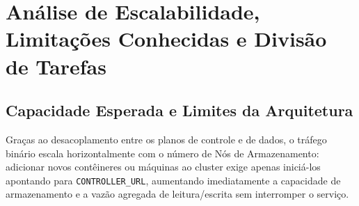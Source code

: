 \documentclass[10pt,a4paper]{article}
\begin{document}
\section{Análise de Escalabilidade, Limitações Conhecidas e Divisão de Tarefas}

\subsection{Capacidade Esperada e Limites da Arquitetura}
Graças ao desacoplamento entre os planos de controle e de dados, o tráfego binário escala horizontalmente com o número de Nós de Armazenamento: adicionar novos contêineres ou máquinas ao cluster exige apenas iniciá-los apontando para \texttt{CONTROLLER\_URL}, aumentando imediatamente a capacidade de armazenamento e a vazão agregada de leitura/escrita sem interromper o serviço.
\end{document}
